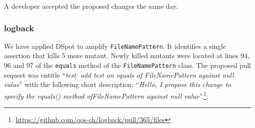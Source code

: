 \documentclass[table,xcdraw,smallextended]{svjour3}
\newcommand{\dspot}{DSpot\xspace}
\begin{document}
\begin{figure}[H]
    \centering{}
\end{figure}

A developer accepted the proposed changes the same day.


\subsubsection{logback}

We have applied \dspot to amplify \texttt{FileNamePattern}. It identifies a single assertion that kills 5 more mutant. Newly killed mutants were located at lines 94, 96 and 97 of the \texttt{equals} method of the \texttt{FileNamePattern} class. The proposed pull request was entitle ``\emph{test: add test on equals of FileNamePattern against null value}'' with the following short description: ``\emph{Hello, I propose this change to specify the equals() method ofFileNamePattern against null value}''.\footnote{\url{https://github.com/qos-ch/logback/pull/365/files}}:
\end{document}
